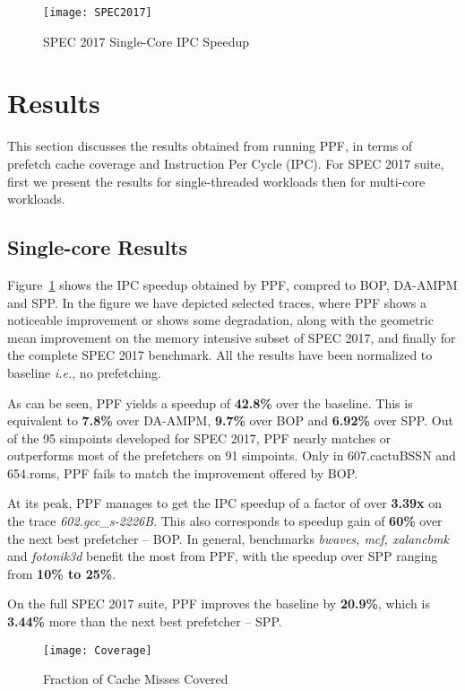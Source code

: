 \begin{figure}[ht]
\texttt{[image: SPEC2017]}
\caption{SPEC 2017 Single-Core IPC Speedup}
\label{Fig:SPEC2017_1core}
\end{figure}

\section{Results}
\label{Results}

This section discusses the results obtained from running PPF, in
terms of prefetch cache coverage and Instruction Per
Cycle (IPC).  For SPEC 2017 suite, first we present the
results for single-threaded workloads then for multi-core
workloads.

\subsection{Single-core Results}
\label{Results-Single}


Figure~\ref{Fig:SPEC2017_1core} shows the IPC speedup obtained by
PPF, compred to BOP, DA-AMPM and SPP. 
In the figure we have depicted selected traces, where PPF shows a 
noticeable improvement or shows some degradation, along with the 
geometric mean improvement on the memory intensive subset of SPEC 2017, 
and finally for the complete SPEC 2017 benchmark. 
All the results have been normalized to baseline \textit{i.e.}, no
prefetching.  

As can be seen, PPF yields a speedup of \textbf{42.8\%} over
the baseline. This is equivalent to \textbf{7.8\%} over DA-AMPM, \textbf{9.7\%} over BOP
and \textbf{6.92\%} over SPP.  Out of the 95 simpoints developed for SPEC 2017, 
PPF nearly matches or outperforms most of the prefetchers on 91 simpoints.
Only in 607.cactuBSSN and 654.roms, PPF fails to match the improvement 
offered by BOP.

At its peak, PPF manages to get the IPC speedup of a factor of
over \textbf{3.39x} on the trace \textit{602.gcc\_s-2226B}.  This also
corresponds to speedup gain of \textbf{60\%} over the next best
prefetcher -- BOP. 
In general, benchmarks \textit{bwaves, mcf, xalancbmk} 
and \textit{fotonik3d} benefit the most from PPF, with the speedup over
SPP ranging from \textbf{10\% to 25\%}.

On the full SPEC 2017 suite, PPF improves the baseline by \textbf{20.9\%},
which is \textbf{3.44\%} more than the next best prefetcher -- SPP.

\begin{figure}[h]
\texttt{[image: Coverage]}
\caption{Fraction of Cache Misses Covered}
\label{Fig:Coverage}
\end{figure}

